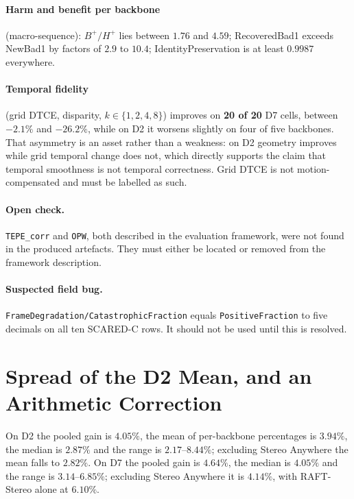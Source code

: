 \documentclass[11pt,a4paper]{article}
\begin{document}
\paragraph{Harm and benefit per backbone} (macro-sequence):
$B^{+}/H^{+}$ lies between $1.76$ and $4.59$; RecoveredBad1 exceeds
NewBad1 by factors of $2.9$ to $10.4$; IdentityPreservation is at
least $0.9987$ everywhere.

\paragraph{Temporal fidelity} (grid DTCE, disparity,
$k \in \{1,2,4,8\}$) improves on \textbf{20 of 20} D7 cells, between
$-2.1\%$ and $-26.2\%$, while on D2 it worsens slightly on four of
five backbones. That asymmetry is an asset rather than a weakness: on
D2 geometry improves while grid temporal change does not, which
directly supports the claim that temporal smoothness is not temporal
correctness. Grid DTCE is not motion-compensated and must be labelled
as such.

\paragraph{Open check.}
\texttt{TEPE\_corr} and \texttt{OPW}, both described in the evaluation
framework, were not found in the produced artefacts. They must either
be located or removed from the framework description.

\paragraph{Suspected field bug.}
\texttt{FrameDegradation/CatastrophicFraction} equals
\texttt{PositiveFraction} to five decimals on all ten SCARED-C rows.
It should not be used until this is resolved.

\section*{Spread of the D2 Mean, and an Arithmetic Correction}

On D2 the pooled gain is $4.05\%$, the mean of per-backbone
percentages is $3.94\%$, the median is $2.87\%$ and the range is
$2.17$--$8.44\%$; excluding Stereo Anywhere the mean falls to
$2.82\%$. On D7 the pooled gain is $4.64\%$, the median is $4.05\%$
and the range is $3.14$--$6.85\%$; excluding Stereo Anywhere it is
$4.14\%$, with RAFT-Stereo alone at $6.10\%$.
\end{document}
